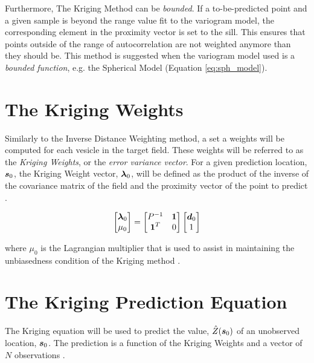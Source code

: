 \noindent Furthermore, The Kriging Method can be \textit{bounded}. If a to-be-predicted point and a given sample is beyond the range value fit to the variogram model, the corresponding element in the proximity vector is set to the sill. This ensures that points outside of the range of autocorrelation are not weighted anymore than they should be. This method is suggested when the variogram model used is a \textit{bounded function}, e.g. the Spherical Model (Equation \ref{eq:sph_model}).

\section{The Kriging Weights} \label{sec:krigweights}
Similarly to the Inverse Distance Weighting method, a set a weights will be computed for each vesicle in the target field. These weights will be referred to as the \textit{Kriging Weights}, or the \textit{error variance vector}. For a given prediction location, ${\it{\boldsymbol{s}}}_0$, the Kriging Weight vector, ${\it{\boldsymbol{\lambda}}}_0$, will be defined as the product of the inverse of the covariance matrix of the field and the proximity vector of the point to predict \cite{felus:srn}.

\begin{equation}
    \begin{bmatrix}
    {\it{\boldsymbol{\lambda}}}_{0} \\
    \mu_0
    \end{bmatrix} = \begin{bmatrix} P^{-1} & {\it{\boldsymbol{1}}} \\
                                    {\it{\boldsymbol{1}}}^T & 0 \end{bmatrix}
                                    \begin{bmatrix} 
                                    {\it{\boldsymbol{d}}}_{0} \\
                                    1
                                    \end{bmatrix}
    \label{eq:krigweights}
\end{equation}

\noindent where $\mu_0$ is the Lagrangian multiplier that is used to assist in maintaining the unbiasedness condition of the Kriging method \cite{felus:srn}. 

\section{The Kriging Prediction Equation}
The Kriging equation will be used to predict the value, $\hat{Z}({\it{\boldsymbol{s}}}_0)$ of an unobserved location, ${\it{\boldsymbol{s}}}_0$. The prediction is a function of the Kriging Weights and a vector of $N$ observations \cite{felus:srn}. 

